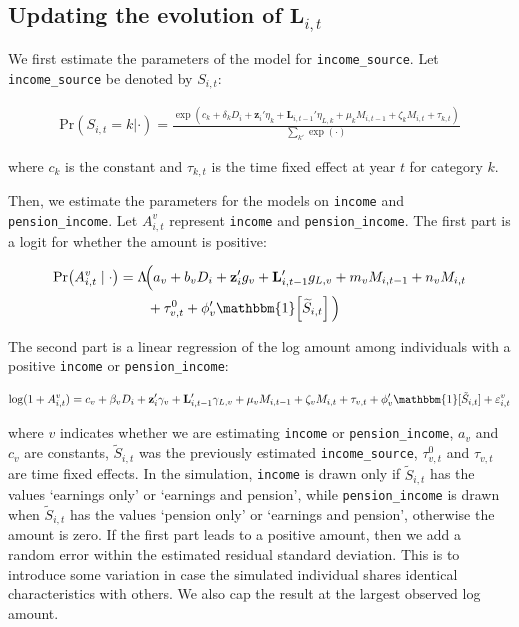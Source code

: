 \documentclass[a4paper,12pt]{article}
\theoremstyle{plain}
\theoremstyle{definition}
\theoremstyle{TheoremNum}
\theoremstyle{CorollaryNum}
\theoremstyle{PropositionNum}
\theoremstyle{TheoremNum}
\begin{document}
\subsection*{Updating the evolution of $\mathbf{L}_{i,t}$}
\makeatletter
\def\@currentlabelname{Updating the evolution of $\mathbf{L}_{i,t}$}
\makeatother
\label{app:updating_history}

We first estimate the parameters of the model for \texttt{income\_source}. Let \texttt{income\_source} be denoted by $S_{i,t}$:

\begin{align*}
\text{Pr}(S_{i,t} = k | \cdot) = \frac{\exp \left(c_k+\delta_kD_i +\mathbf{z}_i'\eta_k + \mathbf{L}_{i,t-1}'\eta_{L,k} + \mu_kM_{i,t-1} + \zeta_k M_{i,t} + \tau_{k,t}\right)}{\sum_{k'} \exp(\cdot)}
\end{align*}

where $c_k$ is the constant and $\tau_{k,t}$ is the time fixed effect at year $t$ for category $k$. 

Then, we estimate the parameters for the models on \texttt{income} and \texttt{pension\_income}. Let $A_{i,t}^v$ represent \texttt{income} and \texttt{pension\_income}. The first part is a logit for whether the amount is positive:

\begin{align*}
\Pr\!\left(A_{i,t}^v \mid \cdot\right)
&=
\Lambda\!\Big(
    a_v
    + b_v D_i
    + \mathbf{z}_i' g_v
    + \mathbf{L}_{i,t-1}'g_{L,v}
    + m_v M_{i,t-1}
    + n_v M_{i,t} \\
&\qquad
    + \tau_{v,t}^0
    + \phi_v' \mathbbm{1}\!\left[\widetilde{S}_{i,t}\right]
\Big)
\end{align*}

The second part is a linear regression of the log amount among individuals with a positive \texttt{income} or \texttt{pension\_income}:

\begin{align*}
\log(1+A_{i,t}^v) = c_v + \beta_v D_i + \mathbf{z}_i'\gamma_v + \mathbf{L}_{i,t-1}'\gamma_{L,v} + \mu_v M_{i,t-1} + \zeta_v M_{i,t} + \tau_{v,t} + \phi_v' \mathbbm{1}[\tilde S_{i,t}] + \varepsilon_{i,t}^v
\end{align*}

where $v$ indicates whether we are estimating \texttt{income} or \texttt{pension\_income}, $a_v$ and $c_v$ are constants, $\tilde S_{i,t}$ was the previously estimated \texttt{income\_source}, $\tau_{v,t}^0$ and $\tau_{v,t}$ are time fixed effects. In the simulation, \texttt{income} is drawn only if $\tilde{S}_{i,t}$ has the values `earnings only' or `earnings and pension', while \texttt{pension\_income} is drawn when $\tilde{S}_{i,t}$ has the values `pension only' or `earnings and pension', otherwise the amount is zero. If the first part leads to a positive amount, then we add a random error within the estimated residual standard deviation. This is to introduce some variation in case the simulated individual shares identical characteristics with others. We also cap the result at the largest observed log amount. 
\end{document}
